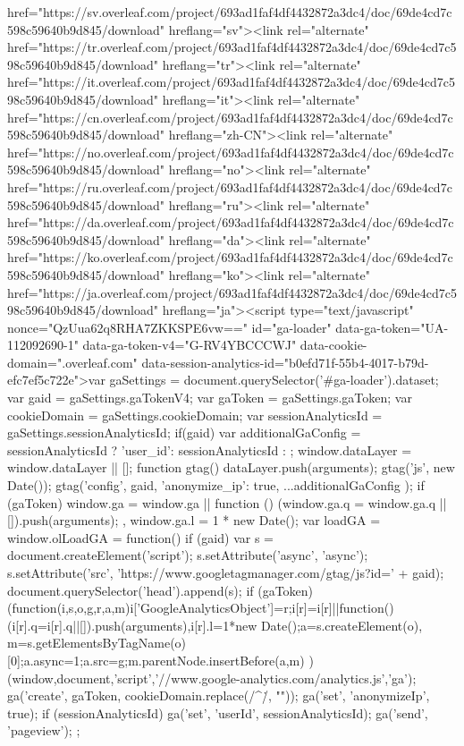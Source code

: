 href="https://sv.overleaf.com/project/693ad1faf4df4432872a3dc4/doc/69de4cd7c598c59640b9d845/download" hreflang="sv"><link rel="alternate" href="https://tr.overleaf.com/project/693ad1faf4df4432872a3dc4/doc/69de4cd7c598c59640b9d845/download" hreflang="tr"><link rel="alternate" href="https://it.overleaf.com/project/693ad1faf4df4432872a3dc4/doc/69de4cd7c598c59640b9d845/download" hreflang="it"><link rel="alternate" href="https://cn.overleaf.com/project/693ad1faf4df4432872a3dc4/doc/69de4cd7c598c59640b9d845/download" hreflang="zh-CN"><link rel="alternate" href="https://no.overleaf.com/project/693ad1faf4df4432872a3dc4/doc/69de4cd7c598c59640b9d845/download" hreflang="no"><link rel="alternate" href="https://ru.overleaf.com/project/693ad1faf4df4432872a3dc4/doc/69de4cd7c598c59640b9d845/download" hreflang="ru"><link rel="alternate" href="https://da.overleaf.com/project/693ad1faf4df4432872a3dc4/doc/69de4cd7c598c59640b9d845/download" hreflang="da"><link rel="alternate" href="https://ko.overleaf.com/project/693ad1faf4df4432872a3dc4/doc/69de4cd7c598c59640b9d845/download" hreflang="ko"><link rel="alternate" href="https://ja.overleaf.com/project/693ad1faf4df4432872a3dc4/doc/69de4cd7c598c59640b9d845/download" hreflang="ja"><script type="text/javascript" nonce="QzUua62q8RHA7ZKKSPE6vw==" id="ga-loader" data-ga-token="UA-112092690-1" data-ga-token-v4="G-RV4YBCCCWJ" data-cookie-domain=".overleaf.com" data-session-analytics-id="b0efd71f-55b4-4017-b79d-efc7ef5c722e">var gaSettings = document.querySelector('#ga-loader').dataset;
var gaid = gaSettings.gaTokenV4;
var gaToken = gaSettings.gaToken;
var cookieDomain = gaSettings.cookieDomain;
var sessionAnalyticsId = gaSettings.sessionAnalyticsId;
if(gaid) {
    var additionalGaConfig = sessionAnalyticsId ? { 'user_id': sessionAnalyticsId } : {};
    window.dataLayer = window.dataLayer || [];
    function gtag(){
        dataLayer.push(arguments);
    }
    gtag('js', new Date());
    gtag('config', gaid, { 'anonymize_ip': true, ...additionalGaConfig });
}
if (gaToken) {
    window.ga = window.ga || function () {
        (window.ga.q = window.ga.q || []).push(arguments);
    }, window.ga.l = 1 * new Date();
}
var loadGA = window.olLoadGA = function() {
    if (gaid) {
        var s = document.createElement('script');
        s.setAttribute('async', 'async');
        s.setAttribute('src', 'https://www.googletagmanager.com/gtag/js?id=' + gaid);
        document.querySelector('head').append(s);
    } 
    if (gaToken) {
        (function(i,s,o,g,r,a,m){i['GoogleAnalyticsObject']=r;i[r]=i[r]||function(){
        (i[r].q=i[r].q||[]).push(arguments)},i[r].l=1*new Date();a=s.createElement(o),
        m=s.getElementsByTagName(o)[0];a.async=1;a.src=g;m.parentNode.insertBefore(a,m)
        })(window,document,'script','//www.google-analytics.com/analytics.js','ga');
        ga('create', gaToken, cookieDomain.replace(/^\./, ""));
        ga('set', 'anonymizeIp', true);
        if (sessionAnalyticsId) {
            ga('set', 'userId', sessionAnalyticsId);
        }
        ga('send', 'pageview');
    }
};
